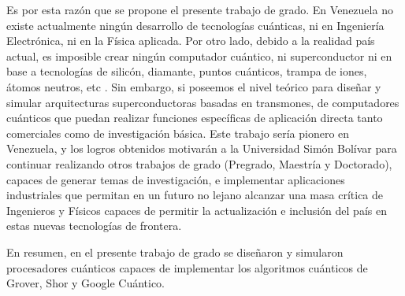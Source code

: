 Es por esta razón que se propone el presente trabajo de grado. En Venezuela no existe actualmente ningún desarrollo de tecnologías cuánticas, ni en Ingeniería Electrónica, ni en la Física aplicada. Por otro lado, debido a la realidad país actual, es imposible crear ningún computador cuántico, ni superconductor ni en base a tecnologías de silicón, diamante, puntos cuánticos, trampa de iones, átomos neutros, etc \cite{Nakahara_2008}. Sin embargo, si poseemos el nivel teórico para diseñar y simular arquitecturas superconductoras basadas en transmones, de computadores cuánticos que puedan realizar funciones específicas de aplicación directa tanto comerciales como de investigación básica.  Este trabajo sería pionero en Venezuela, y los logros obtenidos motivarán a la Universidad Simón Bolívar para continuar realizando otros trabajos de grado (Pregrado, Maestría y Doctorado), capaces de generar temas de investigación, e implementar aplicaciones industriales que permitan en un futuro no lejano alcanzar una masa crítica de Ingenieros y Físicos capaces de permitir la actualización e inclusión del país en estas nuevas tecnologías de frontera.

En resumen, en el presente trabajo de grado se diseñaron y simularon procesadores cuánticos capaces de implementar los algoritmos cuánticos de Grover, Shor y Google Cuántico.
